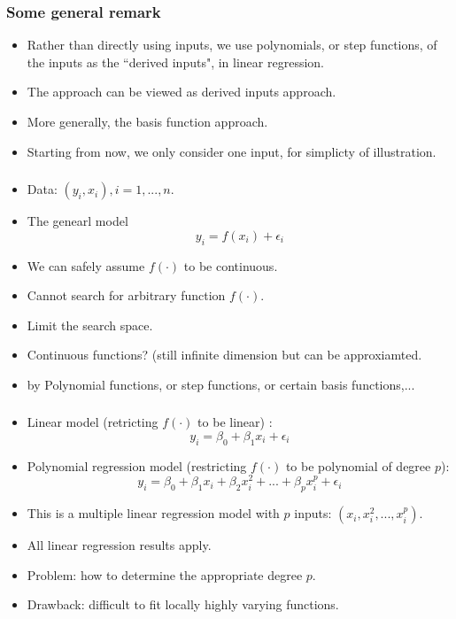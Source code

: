 \documentclass{beamer}
\begin{document}
         \begin{frame}
         	\frametitle{Some general remark}
         	\begin{itemize}
         	
         		\item  Rather than directly using inputs, we use polynomials, or step functions, of the inputs 
         		as the ``derived inputs", in linear regression.
         		\item  The approach can be viewed  as derived inputs approach.
         		\item More generally, the basis function approach. 
         	  \item Starting from now, we only consider one input, for simplicty of illustration.
         	\end{itemize}
         \end{frame} 
        
          \begin{frame}
          	\frametitle{}
          	\begin{itemize}
          			\item  Data: $(y_i, x_i), i=1,...,n$.
          		\item  The genearl model
          		$$ y_i = f(x_i) + \epsilon_i$$
          		\item  We can safely assume $f(\cdot)$ to be continuous.
          		\item  Cannot search for arbitrary function $f(\cdot)$.
          		\item Limit the search space.
          		\item Continuous functions? (still infinite dimension but can be approxiamted.
          		\item by Polynomial functions, or step functions, or certain basis functions,...
          			\end{itemize}
          		\end{frame} 
          		
          		\begin{frame}
          			\frametitle{}
          			\begin{itemize}
          		 
          		\item  Linear model (retricting $f(\cdot)$ to be linear) :
          		$$ y_i = \beta_0 + \beta_1 x_i + \epsilon_i$$
          		\item  Polynomial regression model (restricting $f(\cdot)$ to be polynomial of degree $p$):
          			$$ y_i = \beta_0 + \beta_1 x_i + \beta_2 x_i^2 + ...+ \beta_p x_i^p + \epsilon_i$$
          		\item This is a multiple linear regression model with $p$ inputs:
          		$(x_i, x_i^2, ..., x_i^p)$.
          		\item All linear regression results apply.
          		\item Problem: how to determine the appropriate degree $p$.
          	   \item Drawback: difficult to fit locally highly varying functions.
          	\end{itemize}
          \end{frame} 
       
\end{document}
